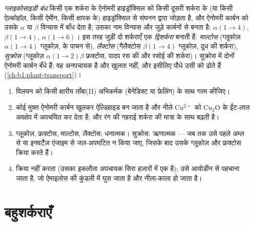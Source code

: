 \begin{definition}[ग्लाइकोसाइडी बंध, द्विशर्करा]\label{def:b1:carbohydrates:glycosidic}
\emph{ग्लाइकोसाइडी बंध} किसी एक शर्करा के
ऐनोमरी हाइड्रॉक्सिल को किसी दूसरी शर्करा के (या किसी ऐल्कोहॉल, किसी
ऐमीन, किसी क्षारक के) हाइड्रॉक्सिल से संघनन द्वारा जोड़ता है, और ऐनोमरी
कार्बन को उसके $\alpha$ या $\beta$ विन्यास में बाँध देता है; उसका नाम
विन्यास और जुड़े कार्बनों से बनता है: $\alpha(1{\to}4)$,
$\beta(1{\to}4)$, $\alpha(1{\to}6)$। इस तरह जुड़ी दो शर्कराएँ एक
\emph{द्विशर्करा} बनाती हैं: \emph{माल्टोस}
(ग्लूकोज़ $\alpha(1{\to}4)$ ग्लूकोज़,  के पाचन से),
\emph{लैक्टोस} (गैलैक्टोस $\beta(1{\to}4)$ ग्लूकोज़, दूध की शर्करा),
\emph{सुक्रोस} (ग्लूकोज़ $\alpha(1{\to}2)\beta$ फ्रक्टोस, पादप रस की और
रसोई की शर्करा)। सुक्रोस में दोनों ऐनोमरी कार्बन बँधे हैं: वह अनपचायक है
और खुलता नहीं, और इसीलिए पौधे उसी को ढोते हैं
(\cref{ch:b1:plant-transport})।
\end{definition}

\begin{method}[अपचायक शर्करा की जाँच]\label{met:b1:carbohydrates:reducing}
\begin{enumerate}
  \item विलयन को किसी क्षारीय ताँबा(II) अभिकर्मक (बेनेडिक्ट या फ़ेलिंग)
        के साथ गरम कीजिए।
  \item कोई मुक्त ऐनोमरी कार्बन खुलकर ऐल्डिहाइड बन जाता है और नीले
        $\mathrm{Cu^{2+}}$ को $\mathrm{Cu_2O}$ के ईंट-लाल अवक्षेप में
        अपचयित कर देता है; और रंग की गहराई शर्करा की मात्रा के साथ
        बढ़ती है।
  \item ग्लूकोज़, फ्रक्टोस, माल्टोस, लैक्टोस: धनात्मक। सुक्रोस:
        ऋणात्मक --- जब तक उसे पहले अम्ल से या इनवर्टेज़ एंजाइम से
        जल-अपघटित न किया जाए, जिसके बाद उसके ग्लूकोज़ और फ्रक्टोस
        क्रिया करते हैं।
  \item {} क्रिया नहीं करता (उसका इकलौता अपचायक सिरा हज़ारों में एक
        है); उसे आयोडीन से पहचाना जाता है, जो ऐमाइलोस की कुंडली में घुस
        जाता है और नीला-काला हो जाता है।
\end{enumerate}
\end{method}

\section{बहुशर्कराएँ}

